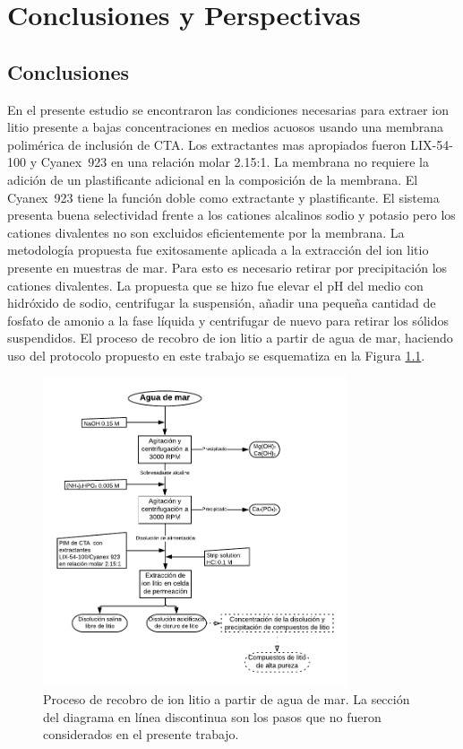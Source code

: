 \chapter{Conclusiones y Perspectivas}
\section{Conclusiones}
En el presente estudio se encontraron las condiciones necesarias para extraer ion litio presente a bajas concentraciones en medios acuosos usando una membrana polimérica de inclusión de CTA. Los extractantes mas apropiados fueron LIX-54-100 y Cyanex~923 en una relación molar 2.15:1. La membrana no requiere la adición de un plastificante adicional en la composición de la membrana. El Cyanex~923 tiene la función doble como extractante y plastificante. El sistema presenta buena selectividad frente a los cationes alcalinos sodio y potasio pero los cationes divalentes no son excluidos eficientemente por la membrana. La metodología propuesta fue exitosamente aplicada a la extracción del ion litio presente en muestras de mar. Para esto es necesario retirar por precipitación los cationes divalentes. La propuesta que se hizo fue elevar el pH del medio con hidróxido de sodio, centrifugar la suspensión, añadir una pequeña cantidad de fosfato de amonio a la fase líquida y centrifugar de nuevo para retirar los sólidos suspendidos. El proceso de recobro de ion litio a partir de agua de mar, haciendo uso del protocolo propuesto en este trabajo se esquematiza en la Figura \ref{fig:diagrama}.

{
\begin{figure}[h]
    \centering
    \includegraphics[width = 0.8\textwidth]{chap6/DiagramaProcesoLitioTesis.pdf}
    \caption[Proceso de recobro de ion litio a partir de agua de mar.]{Proceso de recobro de ion litio a partir de agua de mar. La sección del diagrama en línea discontinua son los pasos que no fueron considerados en el presente trabajo.}
    \label{fig:diagrama}
\end{figure}}

